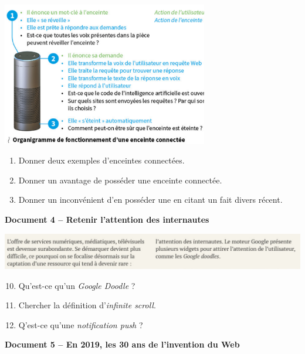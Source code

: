 \documentclass[a4paper]{article}
\begin{document}
\begin{multicols}{2}
  \begin{center}
    \includegraphics[width=9cm]{enceinte_connectee.png} 
  \end{center}\columnbreak
  \begin{enumerate}[resume]
    \item Donner deux exemples d'enceintes connectées.
    \item Donner un avantage de posséder une enceinte connectée.
    \item Donner un inconvénient d'en posséder une en citant un fait divers récent.
  \end{enumerate}
\end{multicols}

\bigskip

\textbf{Document 4 -- Retenir l'attention des internautes} 

\begin{center}
  \includegraphics[width=16cm]{attention_internautes.png}
\end{center}

\begin{enumerate}[resume]
  \setcounter{enumi}{9}
  \item Qu'est-ce qu'un \textit{Google Doodle} ?
  \item Chercher la définition d'\textit{infinite scroll}.
  \item Q'est-ce qu'une \textit{notification push} ?
\end{enumerate}

\bigskip

\textbf{Document 5 -- En 2019, les 30 ans de l'invention du Web} 
\end{document}
